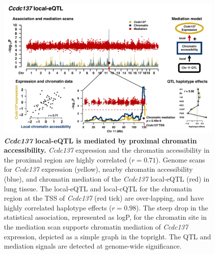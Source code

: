 \documentclass[9pt,twocolumn,twoside]{gsajnl}
\begin{document}
\begin{figure}[h]
\includegraphics[width=\textwidth, trim={0in 0in 0in 0in}, clip]{figs/ccdc137_mediation.pdf}
\caption{\textbf{\textit{Ccdc137} local-eQTL is mediated by proximal chromatin accessibility.} \textit{Ccdc137} expression and the chromatin accessibility in the proximal region are highly correlated ($r = 0.71$). Genome scans for \textit{Ccdc137} expression (yellow), nearby chromatin accessibility (blue), and chromatin mediation of the \textit{Ccdc137} local-eQTL (red) in lung tissue. The local-eQTL and local-cQTL for the chromatin region at the TSS of \textit{Ccdc137} (red tick) are over-lapping, and have highly correlated haplotype effects ($r = 0.98$). The steep drop in the statistical association, represented as logP, for the chromatin site in the mediation scan supports chromatin mediation of \textit{Ccdc137} expression, depicted as a simple graph in the topright. The QTL and mediation signals are detected at genome-wide significance. \label{fig:ccdc137_mediation}}
\end{figure}
\end{document}
